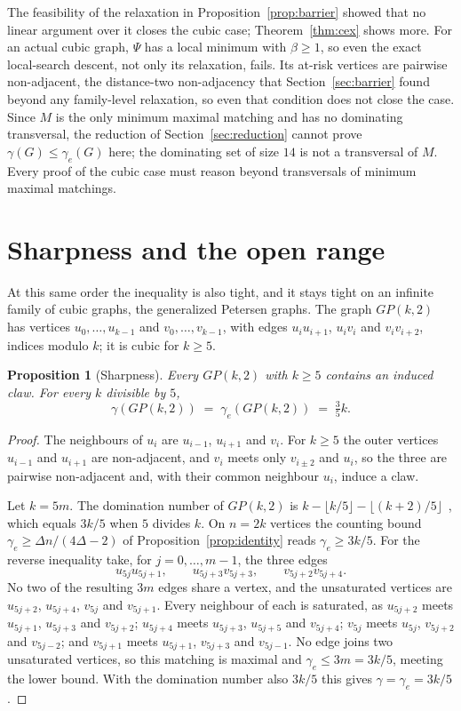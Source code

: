 \documentclass[11pt]{article}
\newtheorem{proposition}{Proposition}
\theoremstyle{definition}
\theoremstyle{remark}
\newcommand{\edom}{\gamma_{e}}
\newcommand{\Pot}{\Psi}
\begin{document}
\noindent
The feasibility of the relaxation in Proposition~\ref{prop:barrier} showed that no
linear argument over it closes the cubic case; Theorem~\ref{thm:cex} shows more. For an
actual cubic graph, $\Pot$ has a local minimum with $\beta \ge 1$, so even the
exact local-search descent, not only its relaxation, fails. Its at-risk vertices
are pairwise non-adjacent, the distance-two non-adjacency that
Section~\ref{sec:barrier} found beyond any family-level relaxation, so even that
condition does not close the case. Since
$M$ is the only minimum maximal matching and has no dominating transversal, the
reduction of Section~\ref{sec:reduction} cannot prove $\gamma(G) \le \edom(G)$
here; the dominating set of size $14$ is not a transversal of $M$. Every proof of
the cubic case must reason beyond transversals of minimum maximal matchings.

\section{Sharpness and the open range}\label{sec:sharp}

At this same order the inequality is also tight, and it stays tight on an infinite
family of cubic graphs, the generalized Petersen graphs. The graph
$GP(k,2)$ has vertices $u_0, \dots, u_{k-1}$ and $v_0, \dots, v_{k-1}$, with
edges $u_i u_{i+1}$, $u_i v_i$ and $v_i v_{i+2}$, indices modulo $k$; it is cubic
for $k \ge 5$.

\begin{proposition}[Sharpness]\label{prop:sharp}
Every $GP(k,2)$ with $k \ge 5$ contains an induced claw. For every $k$ divisible
by $5$,
\[
  \gamma(GP(k,2)) \;=\; \edom(GP(k,2)) \;=\; \tfrac{3}{5}k.
\]
\end{proposition}

\begin{proof}
The neighbours of $u_i$ are $u_{i-1}$, $u_{i+1}$ and $v_i$. For $k \ge 5$ the
outer vertices $u_{i-1}$ and $u_{i+1}$ are non-adjacent, and $v_i$ meets only
$v_{i \pm 2}$ and $u_i$, so the three are pairwise non-adjacent and, with their
common neighbour $u_i$, induce a claw.

Let $k = 5m$. The domination number of $GP(k,2)$ is
$k - \lfloor k/5 \rfloor - \lfloor (k+2)/5
\rfloor$~\cite{FuYangJiang2009}, which equals $3k/5$ when $5$ divides $k$. On
$n = 2k$ vertices the counting bound $\edom \ge \Delta n/(4\Delta -
2)$ of Proposition~\ref{prop:identity} reads $\edom \ge 3k/5$. For the reverse inequality take,
for $j = 0, \dots, m-1$, the three edges
\[
  u_{5j}u_{5j+1}, \qquad u_{5j+3}v_{5j+3}, \qquad v_{5j+2}v_{5j+4} .
\]
No two of the resulting $3m$ edges share a vertex, and the unsaturated vertices
are $u_{5j+2}$, $u_{5j+4}$, $v_{5j}$ and $v_{5j+1}$. Every neighbour of each is
saturated, as $u_{5j+2}$ meets $u_{5j+1}$, $u_{5j+3}$ and $v_{5j+2}$; $u_{5j+4}$
meets $u_{5j+3}$, $u_{5j+5}$ and $v_{5j+4}$; $v_{5j}$ meets $u_{5j}$, $v_{5j+2}$
and $v_{5j-2}$; and $v_{5j+1}$ meets $u_{5j+1}$, $v_{5j+3}$ and $v_{5j-1}$. No
edge joins two unsaturated vertices, so this matching is maximal and $\edom \le
3m = 3k/5$, meeting the lower bound. With the domination number also $3k/5$ this
gives $\gamma = \edom = 3k/5$.
\end{proof}
\end{document}
